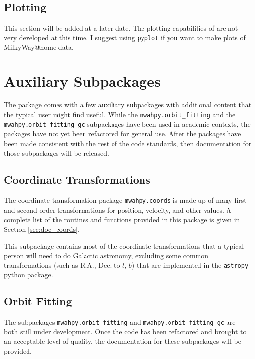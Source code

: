 \documentclass{article}
\begin{document}
\subsection{Plotting}

This section will be added at a later date. The plotting capabilities of \mwahpy are not very developed at this time. I suggest using \verb!pyplot! if you want to make plots of MilkyWay@home data.

\newpage

\section{Auxiliary Subpackages}

The \mwahpy package comes with a few auxiliary subpackages with additional content that the typical user might find useful. While the \verb!mwahpy.orbit_fitting! and the \verb!mwahpy.orbit_fitting_gc! subpackages have been used in academic contexts, the packages have not yet been refactored for general use. After the packages have been made consistent with the rest of the \mwahpy code standards, then documentation for those subpackages will be released. 

\subsection{Coordinate Transformations}

The coordinate transformation package \verb!mwahpy.coords! is made up of many first and second-order transformations for position, velocity, and other values. A complete list of the routines and functions provided in this package is given in Section \ref{sec:doc_coords}. 

This subpackage contains most of the coordinate transformations that a typical person will need to do Galactic astronomy, excluding some common transformations (such as R.A., Dec. to $l$, $b$) that are implemented in the \verb!astropy! python package. 

\subsection{Orbit Fitting}

The subpackages \verb!mwahpy.orbit_fitting! and \verb!mwahpy.orbit_fitting_gc! are both still under development. Once the code has been refactored and brought to an acceptable level of quality, the documentation for these subpackages will be provided. 
\end{document}
